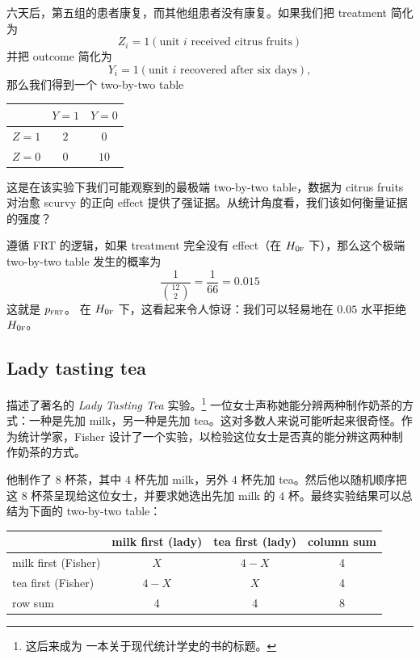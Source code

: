 六天后，第五组的患者康复，而其他组患者没有康复。如果我们把 treatment 简化为
$$
Z_i  = 1(\text{unit } i \text{ received citrus fruits})
$$
并把 outcome 简化为
$$
Y_i = 1(\text{unit } i \text{ recovered after six days}),
$$
那么我们得到一个 two-by-two table

\begin{center}
\begin{tabular}{lcc}
\hline 
      & $Y =1$ & $Y =0$\\\hline
$Z =1$ & $2$ & $0$\\ 
$Z =0$ & $0$ & $10$\\
\hline 
\end{tabular}
\end{center}


这是在该实验下我们可能观察到的最极端 two-by-two table，数据为 citrus fruits 对治愈 scurvy 的正向 effect 提供了强证据。从统计角度看，我们该如何衡量证据的强度？


遵循 FRT 的逻辑，如果 treatment 完全没有 effect（在 $H_{0\textsc{f}}$ 下），那么这个极端 two-by-two table 发生的概率为
$$
 \frac{1}{\binom{12}{2}} = \frac{1}{66} = 0.015
$$
这就是 $p_{\textsc{frt}}$。
在 $H_{0\textsc{f}}$ 下，这看起来令人惊讶：我们可以轻易地在 $0.05$ 水平拒绝 $H_{0\textsc{f}}$。



\subsection{Lady tasting tea}\label{section::lady-tasting-tea}


\citet{Fisher:1935} 描述了著名的 {\it Lady Tasting Tea} 实验。\footnote{这后来成为 \citet{salsburg2001lady} 一本关于现代统计学史的书的标题。} 一位女士声称她能分辨两种制作奶茶的方式：一种是先加 milk，另一种是先加 tea。这对多数人来说可能听起来很奇怪。作为统计学家，Fisher 设计了一个实验，以检验这位女士是否真的能分辨这两种制作奶茶的方式。

他制作了 $8$ 杯茶，其中 $4$ 杯先加 milk，另外 $4$ 杯先加 tea。然后他以随机顺序把这 $8$ 杯茶呈现给这位女士，并要求她选出先加 milk 的 $4$ 杯。最终实验结果可以总结为下面的 two-by-two table：

\begin{tabular}{lccc}
\hline 
      &    milk first (lady)&    tea first (lady) & column sum \\ \hline
      milk first (Fisher) & $X$ & $4-X$ & 4\\ 
   tea first (Fisher) & $4-X$ & $X$ & 4\\
   row sum & 4 & 4 &8 \\
   \hline 
\end{tabular}


